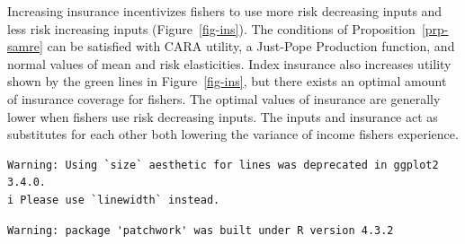 \documentclass[
  super,
  preprint,
  3p]{elsarticle}
\theoremstyle{plain}
\theoremstyle{plain}
\theoremstyle{remark}
\begin{document}
Increasing insurance incentivizes fishers to use more risk decreasing
inputs and less risk increasing inputs (Figure~\ref{fig-ins}). The
conditions of Proposition~\ref{prp-samre} can be satisfied with CARA
utility, a Just-Pope Production function, and normal values of mean and
risk elasticities. Index insurance also increases utility shown by the
green lines in Figure~\ref{fig-ins}, but there exists an optimal amount
of insurance coverage for fishers. The optimal values of insurance are
generally lower when fishers use risk decreasing inputs. The inputs and
insurance act as substitutes for each other both lowering the variance
of income fishers experience.

\begin{verbatim}
Warning: Using `size` aesthetic for lines was deprecated in ggplot2 3.4.0.
i Please use `linewidth` instead.
\end{verbatim}

\begin{verbatim}
Warning: package 'patchwork' was built under R version 4.3.2
\end{verbatim}
\end{document}
